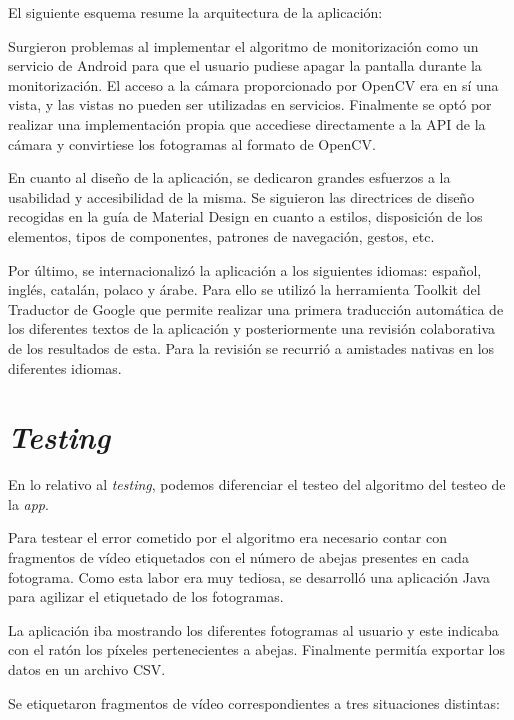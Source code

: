El siguiente esquema resume la arquitectura de la aplicación:


Surgieron problemas al implementar el algoritmo de monitorización como
un servicio de Android para que el usuario pudiese apagar la pantalla
durante la monitorización. El acceso a la cámara proporcionado por
OpenCV era en sí una vista, y las vistas no pueden ser utilizadas en
servicios. Finalmente se optó por realizar una implementación propia que
accediese directamente a la API de la cámara y convirtiese los
fotogramas al formato de OpenCV.

En cuanto al diseño de la aplicación, se dedicaron grandes esfuerzos a
la usabilidad y accesibilidad de la misma. Se siguieron las directrices
de diseño recogidas en la guía de Material Design en cuanto a estilos,
disposición de los elementos, tipos de componentes, patrones de
navegación, gestos, etc.

Por último, se internacionalizó la aplicación a los siguientes idiomas:
español, inglés, catalán, polaco y árabe. Para ello se utilizó la
herramienta Toolkit del Traductor de Google que permite realizar una
primera traducción automática de los diferentes textos de la aplicación
y posteriormente una revisión colaborativa de los resultados de esta.
Para la revisión se recurrió a amistades nativas en los diferentes
idiomas.

\section{\emph{Testing}}\label{testing}

En lo relativo al \emph{testing}, podemos diferenciar el testeo del
algoritmo del testeo de la \emph{app}.

Para testear el error cometido por el algoritmo era necesario contar con
fragmentos de vídeo etiquetados con el número de abejas presentes en
cada fotograma. Como esta labor era muy tediosa, se desarrolló una
aplicación Java para agilizar el etiquetado de los fotogramas.

La aplicación iba mostrando los diferentes fotogramas al usuario y este
indicaba con el ratón los píxeles pertenecientes a abejas. Finalmente
permitía exportar los datos en un archivo CSV.


Se etiquetaron fragmentos de vídeo correspondientes a tres situaciones
distintas:

